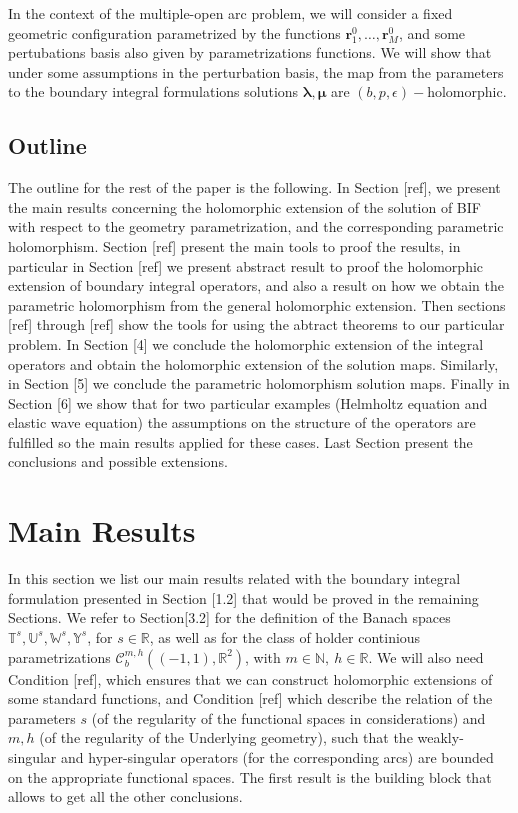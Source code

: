 \documentclass{article}
\newcommand{\todo}[1]{{\color{red}[#1]}}
\newcommand{\bmu} {\bm{\mu}}
\newcommand{\IN}{{\mathbb N}}
\newcommand{\IR}{{\mathbb R}}
\newcommand{\IU}{{\mathbb U}}
\newcommand{\IT}{{\mathbb T}}
\newcommand{\IW}{{\mathbb W}}
\newcommand{\IY}{{\mathbb Y}}
\newcommand{\rgeoh}[2]{\mathcal{C}_b^{#1,#2}\left( (-1,1), \IR^2 \right)}
\newcommand{\bla}{\boldsymbol \lambda}
\newcommand{\br}{\bm{r}}
\begin{document}
In the context of the multiple-open arc problem, we will consider a fixed geometric configuration parametrized by the functions $\br_1^0 ,\hdots, \br_M^0$, and some pertubations basis also given by parametrizations functions. We will show that under some assumptions in the perturbation basis, the map from the parameters to the boundary integral formulations solutions $\bla,\bmu$ are $(b,p,\epsilon)-$holomorphic.
\subsection{Outline}
The outline for the rest of the paper is the following. In Section \todo{ref}, we present the main results concerning the holomorphic extension of the solution of BIF with respect to the geometry parametrization, and the corresponding parametric holomorphism. Section \todo{ref} present the main tools to proof the results, in particular in Section \todo{ref} we present abstract result to proof the holomorphic extension of boundary integral operators, and also a result on how we obtain the parametric holomorphism from the general holomorphic extension. Then sections \todo{ref} through \todo{ref} show the tools for using the abtract theorems to our particular problem. 
In Section \todo{4} we conclude the holomorphic extension of the integral operators and obtain the holomorphic extension of the solution maps. Similarly, in Section \todo{5} we conclude the parametric holomorphism  solution maps. 
Finally in Section \todo{6} we show that for two particular examples (Helmholtz equation and elastic wave equation) the assumptions on the structure of the operators are fulfilled so the main results applied for these cases. Last Section present the conclusions and possible extensions. 
\section{Main Results}
\label{sec:MainResult}
In this section we list our main results related with the boundary integral formulation presented in Section \todo{1.2} that would be proved in the remaining Sections. We refer to Section\todo{3.2} for the definition of the Banach spaces $\IT^s,\IU^s,\IW^s,\IY^s$, for $s \in \IR$, as well as for the class of holder continious parametrizations $\rgeoh{m}{h}$, with $m \in \IN, \ h\in \IR$. We will also need Condition \todo{ref}, which ensures that we can construct holomorphic extensions of some standard functions, and Condition \todo{ref} which describe the relation of the parameters $s$ (of the regularity of the functional spaces in considerations) and $m,h$ (of the regularity of the Underlying geometry), such that the weakly-singular and hyper-singular operators (for the corresponding arcs) are bounded on the appropriate functional spaces. The first result is the building block that allows to get all the other conclusions.
\end{document}
